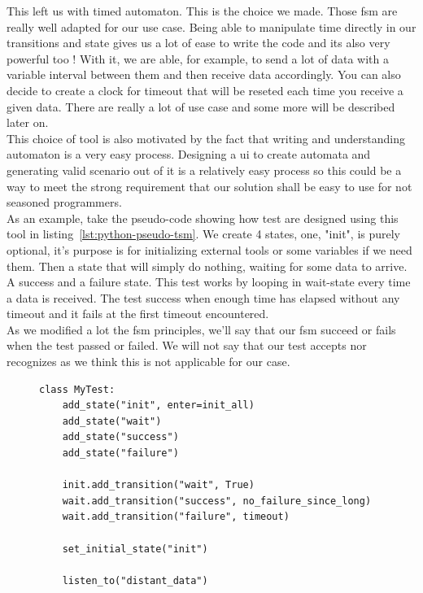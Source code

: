 \documentclass[12pt]{article}
\theoremstyle{definition}
\theoremstyle{definition}
\begin{document}
This left us with timed automaton. This is the choice we made. Those \gls{fsm} are really well adapted for our use case. Being able to manipulate time directly in our transitions and state gives us a lot of ease to write the code and its also very powerful too ! With it, we are able, for example, to send a lot of data with a variable interval between them and then receive data accordingly. You can also decide to create a clock for timeout that will be reseted each time you receive a given data. There are really a lot of use case and some more will be described later on.\\

This choice of tool is also motivated by the fact that writing and understanding automaton is a very easy process. Designing a \gls{ui} to create automata and generating valid scenario out of it is a relatively easy process so this could be a way to meet the strong requirement that our solution shall be easy to use for not seasoned programmers.\\

As an example, take the pseudo-code showing how test are designed using this tool in listing~\ref{lst:python-pseudo-tsm}. We create 4 states, one, "init", is purely optional, it's purpose is for initializing external tools or some variables if we need them. Then a state that will simply do nothing, waiting for some data to arrive. A success and a failure state. This test works by looping in wait-state every time a data is received. The test success when enough time has elapsed without any timeout and it fails at the first timeout encountered.\\

As we modified a lot the \gls{fsm} principles, we'll say that our \gls{fsm} succeed or fails when the test passed or failed. We will not say that our test accepts nor recognizes as we think this is not applicable for our case.\\

\begin{figure}
    \label{python-pseudo-tsm}
    \begin{lstlisting}[frame=single,caption="Pseudo test case example",label={lst:python-pseudo-tsm}]
class MyTest:
    add_state("init", enter=init_all)
    add_state("wait")
    add_state("success")
    add_state("failure")

    init.add_transition("wait", True)
    wait.add_transition("success", no_failure_since_long)
    wait.add_transition("failure", timeout)

    set_initial_state("init")

    listen_to("distant_data")
    \end{lstlisting}
\end{figure}
\end{document}
